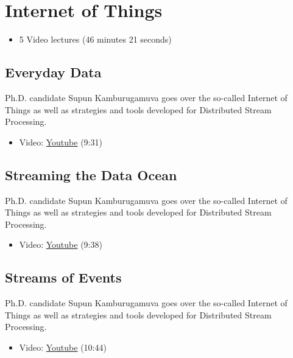 
\FILENAME

\section{Internet of Things}\label{internet-of-things}

\begin{itemize}
\tightlist
\item
  5 Video lectures (46 minutes 21 seconds)
\end{itemize}

\subsection{Everyday Data}\label{everyday-data}

Ph.D. candidate Supun Kamburugamuva goes over the so-called Internet of
Things as well as strategies and tools developed for Distributed Stream
Processing.

\begin{itemize}
\tightlist
\item
  Video:
  \href{https://www.youtube.com/watch?time_continue=9\&v=brv48Tg7Zyw}{Youtube}
  (9:31)
\end{itemize}

\subsection{Streaming the Data Ocean}\label{streaming-the-data-ocean}

Ph.D. candidate Supun Kamburugamuva goes over the so-called Internet of
Things as well as strategies and tools developed for Distributed Stream
Processing.

\begin{itemize}
\tightlist
\item
  Video: \href{https://www.youtube.com/watch?v=hTbveHCjAo4}{Youtube}
  (9:38)
\end{itemize}

\subsection{Streams of Events}\label{streams-of-events}

Ph.D. candidate Supun Kamburugamuva goes over the so-called Internet of
Things as well as strategies and tools developed for Distributed Stream
Processing.

\begin{itemize}
\tightlist
\item
  Video: \href{https://www.youtube.com/watch?v=Ok2Bo8D0EkE}{Youtube}
  (10:44)
\end{itemize}

